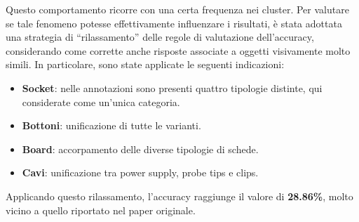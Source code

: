 Questo comportamento ricorre con una certa frequenza nei cluster. Per valutare se tale fenomeno potesse effettivamente influenzare i risultati, è stata adottata una strategia di “rilassamento” delle regole di valutazione dell'accuracy, considerando come corrette anche risposte associate a oggetti visivamente molto simili. In particolare, sono state applicate le seguenti indicazioni:
\begin{itemize}
    \item \textbf{Socket}: nelle annotazioni sono presenti quattro tipologie distinte, qui considerate come un'unica categoria.
    \item \textbf{Bottoni}: unificazione di tutte le varianti.
    \item \textbf{Board}: accorpamento delle diverse tipologie di schede.
    \item \textbf{Cavi}: unificazione tra power supply, probe tips e clips.
\end{itemize}

Applicando questo rilassamento, l'accuracy raggiunge il valore di \textbf{28.86\%}, molto vicino a quello riportato nel paper originale.